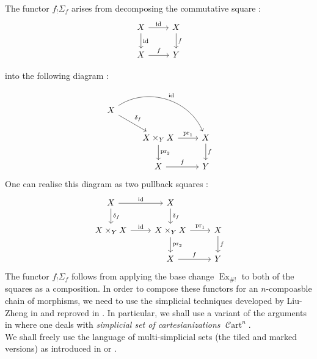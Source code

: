 \documentclass[14pt]{article}
\theoremstyle{definition}
\newcommand{\op}[1]{\operatorname{#1}}
\newcommand{\C}{\mathcal{C}}
\numberwithin{subsection}{section}
\newcommand{\Cart}{\op{\C art}}
\begin{document}
The functor $f_!\Sigma_f$ arises from decomposing the commutative square :
\begin{equation}
    \begin{tikzcd}
        X \arrow[r,"\op{id}"] \arrow[d,"\op{id}"] & X \arrow[d,"f"] \\
        X \arrow[r,"f"] & Y
    \end{tikzcd}
\end{equation}

into the following diagram :
\begin{equation}
    \begin{tikzcd}
        X \arrow[dr,"\delta_f"] \arrow[drr,bend left=50,"\op{id}"] & {} & {} \\
        {} & X \times_Y X \arrow[d,"\op{pr}_2"] \arrow[r,"\op{pr}_1"] & X \arrow[d,"f"] \\
        {} & X \arrow[r,"f"] & Y 
    \end{tikzcd}
\end{equation}
One can realise this diagram as two pullback squares :
\begin{equation}
    \begin{tikzcd}
     X \arrow[d,"\delta_f"] \arrow[r,"\op{id}"]  & X \arrow[d,"\delta_f"] & {} \\
     X \times_Y X \arrow[r,"\op{id}"] & X \times_Y X \arrow[d,"\op{pr}_2"] \arrow[r,"\op{pr}_1"] & X \arrow[d,"f" ]\\
     {} & X \arrow[r, "f"] & Y
    \end{tikzcd}
\end{equation}
The functor $f_!\Sigma_f$ follows from applying the base change $\op{Ex}_{\#!}$ to both of the squares as a composition.  In order to compose these functors for an $n$-compoasble chain of morphisms, we need to use the simplicial techniques developed by Liu-Zheng in \cite{Gluerestnerv} and reproved in \cite{chowdhury2025sixfunctorformalismsii}. In particular, we shall use a variant of the arguments in   \cite[Section 5]{chowdhury2025sixfunctorformalismsii} where one deals with \textit{simplicial set of cartesianizations} $\Cart^n$.\\

We shall freely use the language of multi-simplicial sets (the tiled and marked versions) as introduced in \cite{liu2017enhanced} or \cite{chowdhury2025sixfunctorformalismsii}.\\
\end{document}
